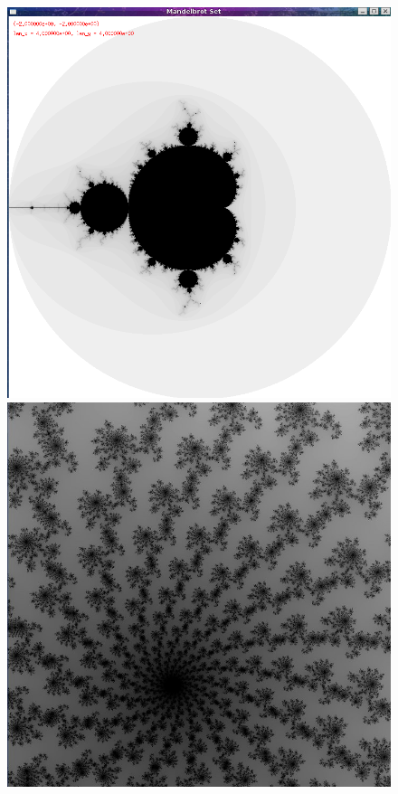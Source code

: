 \begin{enumerate}
	\begin{figure}[H]
      \begin{minipage}[b]{0.46\linewidth}
		\centering
		\includegraphics[scale=0.3]{res/show.png}
      \end{minipage}
      \begin{minipage}[b]{0.46\linewidth}
		\centering
		\includegraphics[scale=0.3]{res/showmore.jpg}
      \end{minipage}
	\end{figure}




\end{enumerate}
